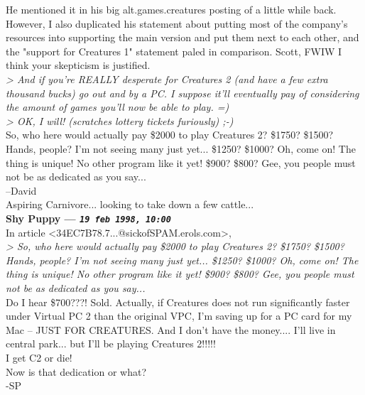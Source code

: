 \documentclass[11pt,twoside,a4paper]{article}
\begin{document}
\begin{multicols*}{2}
He mentioned it in his big alt.games.creatures posting of a little while back. However, I also duplicated his statement about putting most of the company's resources into supporting the main version and put them next to each other, and the "support for Creatures 1" statement paled in comparison. Scott, FWIW I think your skepticism is justified.~\\

\emph{> And if you're REALLY desperate for Creatures 2 (and have a few extra thousand bucks) go out and by a PC. I suppose it'll eventually pay of considering the amount of games you'll now be able to play. =)}~\\
\emph{> OK, I will! (scratches lottery tickets furiously) ;-)}~\\

So, who here would actually pay \$2000 to play Creatures 2? \$1750? \$1500? Hands, people? I'm not seeing many just yet... \$1250? \$1000? Oh, come on! The thing is unique! No other program like it yet! \$900? \$800? Gee, you people must not be as dedicated as you say...~\\

--David~\\
Aspiring Carnivore... looking to take down a few cattle...~\\

 
		
	
		
\textbf{Shy Puppy --- \emph{\texttt{19 feb 1998, 10:00}}}~\\

In article <34EC7B78.7...@sickofSPAM.erols.com>,~\\
\emph{> So, who here would actually pay \$2000 to play Creatures 2? \$1750? \$1500? Hands, people? I'm not seeing many just yet... \$1250? \$1000? Oh, come on! The thing is unique! No other program like it yet! \$900? \$800? Gee, you people must not be as dedicated as you say...}~\\

Do I hear \$700???! Sold.   Actually, if Creatures does not run significantly faster under Virtual PC 2 than the original VPC, I'm saving up for a PC card for my Mac -- JUST FOR CREATURES.  And I don't have the money.... I'll live in central park...  but I'll be playing Creatures 2!!!!!~\\

I get C2 or die!~\\

Now is that dedication or what?~\\
-SP~\\


\end{multicols*}
\end{document}
